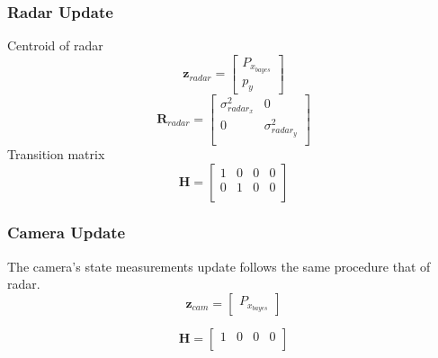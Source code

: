 \subsubsection{Radar Update}\label{sec:2-radar_update}  
Centroid of radar
\begin{equation}
    \mathbf{z}_{radar}=
    \begin{bmatrix}
        P_{x_{bayes}} \\ 
        p_y
    \end{bmatrix}
\end{equation}
\begin{equation}\label{equ:2_radar_R_kf}
    \mathbf{R}_{radar} = 
    \begin{bmatrix}
        \sigma_{radar_x}^2 & 0 \\
        0 & \sigma_{radar_y}^2 \\
      \end{bmatrix}
\end{equation}
Transition matrix
\begin{equation}\label{equ:2_radar_transition_matrix}
    \mathbf{H} = 
    \begin{bmatrix}
        1 & 0 & 0 & 0 \\
        0 & 1 & 0 & 0 \\
      \end{bmatrix}
\end{equation}



\subsubsection{Camera Update}\label{sec:2-camera_update}
The camera's state measurements update follows the same procedure that of radar.
\begin{equation}\label{equ:2_z_cam}
    \mathbf{z}_{cam}=
    \begin{bmatrix}P_{x_{bayes}}\end{bmatrix}
\end{equation}

\begin{equation}\label{equ:2_cam_transition_matrix}
    \mathbf{H} = 
    \begin{bmatrix}
        1 & 0 & 0 & 0 \\
      \end{bmatrix}
\end{equation}
